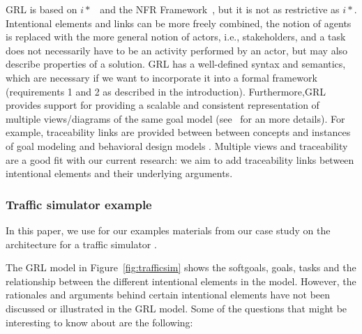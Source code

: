 GRL is based on $i*$~\cite{Yu:1997:TMR:827255.827807} and the NFR Framework~\cite{chung2012non}, but it is not as restrictive as $i*$. Intentional elements and links can be more freely combined, the notion of agents is replaced with the more general notion of actors, i.e., stakeholders, and a task does not necessarily have to be an activity performed by an actor, but may also describe properties of a solution. GRL has a well-defined syntax and semantics, which are necessary if we want to incorporate it into a formal framework (requirements 1 and 2 as described in the introduction). Furthermore,GRL provides support for providing a scalable and consistent representation of multiple views/diagrams of the same goal model (see~\cite[Ch.2]{Ghanavati2013} for an more details). For example, traceability links are provided between between concepts and instances of goal modeling and behavioral design models \cite{}. Multiple views and traceability are a good fit with our current research: we aim to add traceability links between intentional elements and their underlying arguments. 

\subsubsection{Traffic simulator example}
\label{sect:background:casestudy}

In this paper, we use for our examples materials from our case study on the architecture for a traffic simulator \cite{}. 

The GRL model in Figure~\ref{fig:trafficsim} shows the softgoals, goals, tasks and the relationship between the different intentional elements in the model. However, the rationales and arguments behind certain intentional elements have not been discussed or illustrated in the GRL model. Some of the questions that might be interesting to know about are the following:

